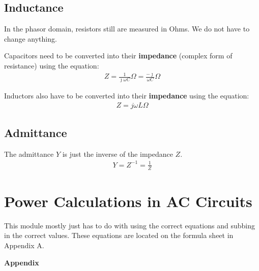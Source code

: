 \documentclass[12pt,letterpaper]{article} \usepackage{amsmath} \usepackage{graphicx} \usepackage[margin=1in]{geometry} \usepackage{longtable}  \usepackage{amssymb}
\begin{document}
	\subsection{Inductance}

	In the phasor domain, resistors still are measured in Ohms. We do not have to change anything. 
	
	Capacitors need to be converted into their \textbf{impedance} (complex form of resistance) using the equation: 
	\begin{align*}
		Z=\frac{1}{\jmath\omega C}\Omega = \frac{-\jmath}{\omega C}\Omega
	\end{align*}

	Inductors also have to be converted into their \textbf{impedance} using the equation:
	\begin{align*}
		Z=j\omega L \Omega
	\end{align*}
	
	\subsection{Admittance}
	The admittance $Y$ is just the inverse of the impedance $Z$. 
	\begin{align*}
		Y=Z^{-1}=\frac{1}{Z}
	\end{align*}
	
	\section{Power Calculations in AC Circuits}
	This module mostly just has to do with using the correct equations and subbing in the correct values. These equations are located on the formula sheet in Appendix A.
	
	\newpage
	\appendix
	\begin{center}
		\Large\textbf{Appendix} \\
		\vspace{0.5em}
	\end{center}
	
\end{document}

